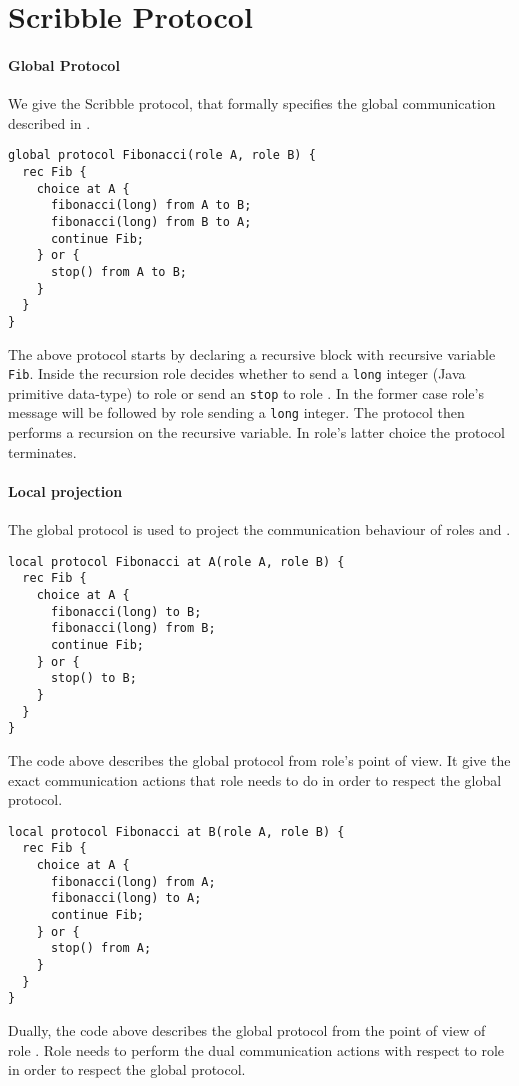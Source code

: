 \section{Scribble Protocol}

\paragraph{Global Protocol}
We give the Scribble protocol, that formally specifies the
global communication described in .
%
\begin{lstlisting}[caption={Global Protocol}]
global protocol Fibonacci(role A, role B) {
  rec Fib {
    choice at A {
      fibonacci(long) from A to B;
      fibonacci(long) from B to A;
      continue Fib;
    } or {
      stop() from A to B;
    }
  }
}
\end{lstlisting}

The above protocol starts by declaring a recursive block
with recursive variable \lstinline|Fib|.
Inside the recursion role \A decides whether to send
a \lstinline|long| integer (Java primitive data-type)
to role \B or send an \lstinline|stop| to role \B.
In the former case role's \A message will be followed
by role \B sending a \lstinline|long| integer. The protocol
then performs a recursion on the recursive variable.
In role's \A latter choice the protocol terminates.

\paragraph{Local projection}
The global protocol is used to project the communication
behaviour of roles \A and \B.

\begin{lstlisting}[caption={Local Protocol for Role \A}]
local protocol Fibonacci at A(role A, role B) {
  rec Fib {
    choice at A {
      fibonacci(long) to B;
      fibonacci(long) from B;
      continue Fib;
    } or {
      stop() to B;
    }
  }
}
\end{lstlisting}

The code above describes the global protocol from role's \A
point of view. It give the exact communication actions that
role \A needs to do in order to respect the global protocol.

\begin{lstlisting}[caption={Local Protocol for Role \B}]
local protocol Fibonacci at B(role A, role B) {
  rec Fib {
    choice at A {
      fibonacci(long) from A;
      fibonacci(long) to A;
      continue Fib;
    } or {
      stop() from A;
    }
  }
}
\end{lstlisting}

Dually, the code above describes the global protocol from
the point of view of role \B. Role \B needs to perform
the dual communication actions with respect to role \A
in order to respect the global protocol.



